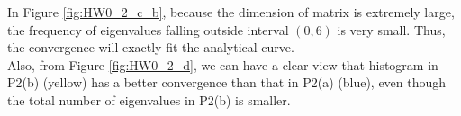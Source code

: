 \documentclass[twoside]{homework}
\begin{document}
In Figure \ref{fig:HW0_2_c_b}, because the dimension of matrix is extremely large, the frequency of eigenvalues falling outside interval $(0,6)$ is very small. Thus, the convergence will exactly fit the analytical curve. \\
Also, from Figure \ref{fig:HW0_2_d}, we can have a clear view that histogram in P2(b) (yellow) has a better convergence than that in P2(a) (blue), even though the total number of eigenvalues in P2(b) is smaller. 






\newpage
\end{document}
